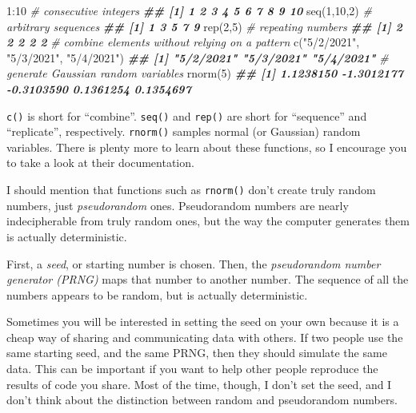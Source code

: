 \documentclass[
  12pt,
  krantz2]{krantz}
\makeatletter
\newenvironment{Shaded}{\begin{snugshade}}{\end{snugshade}}
\newcommand{\CommentTok}[1]{\textcolor[rgb]{0.37,0.37,0.37}{\textit{#1}}}
\newcommand{\DecValTok}[1]{\textcolor[rgb]{0.06,0.06,0.06}{#1}}
\newcommand{\DocumentationTok}[1]{\textcolor[rgb]{0.37,0.37,0.37}{\textbf{\textit{#1}}}}
\newcommand{\FunctionTok}[1]{\textcolor[rgb]{0,0,0}{#1}}
\newcommand{\NormalTok}[1]{#1}
\newcommand{\SpecialCharTok}[1]{\textcolor[rgb]{0,0,0}{#1}}
\newcommand{\StringTok}[1]{\textcolor[rgb]{0.5,0.5,0.5}{#1}}
\newenvironment{kframe}{%
\medskip{}
\setlength{\fboxsep}{.8em}
 \def\at@end@of@kframe{}%
 \ifinner\ifhmode%
  \def\at@end@of@kframe{\end{minipage}}%
  \begin{minipage}{\columnwidth}%
 \fi\fi%
 \def\FrameCommand##1{\hskip\@totalleftmargin \hskip-\fboxsep
 \colorbox{shadecolor}{##1}\hskip-\fboxsep
     \hskip-\linewidth \hskip-\@totalleftmargin \hskip\columnwidth}%
 \MakeFramed {\advance\hsize-\width
   \@totalleftmargin\z@ \linewidth\hsize
   \@setminipage}}%
 {\par\unskip\endMakeFramed%
 \at@end@of@kframe}
\renewenvironment{Shaded}{\begin{kframe}}{\end{kframe}}
\makeatother
\begin{document}
\begin{Shaded}
\begin{Highlighting}[]
\DecValTok{1}\SpecialCharTok{:}\DecValTok{10}         \CommentTok{\# consecutive integers}
\DocumentationTok{\#\#  [1]  1  2  3  4  5  6  7  8  9 10}
\FunctionTok{seq}\NormalTok{(}\DecValTok{1}\NormalTok{,}\DecValTok{10}\NormalTok{,}\DecValTok{2}\NormalTok{)  }\CommentTok{\# arbitrary sequences}
\DocumentationTok{\#\# [1] 1 3 5 7 9}
\FunctionTok{rep}\NormalTok{(}\DecValTok{2}\NormalTok{,}\DecValTok{5}\NormalTok{)     }\CommentTok{\# repeating numbers}
\DocumentationTok{\#\# [1] 2 2 2 2 2}
\CommentTok{\# combine elements without relying on a pattern}
\FunctionTok{c}\NormalTok{(}\StringTok{"5/2/2021"}\NormalTok{, }\StringTok{"5/3/2021"}\NormalTok{, }\StringTok{"5/4/2021"}\NormalTok{) }
\DocumentationTok{\#\# [1] "5/2/2021" "5/3/2021" "5/4/2021"}
\CommentTok{\# generate Gaussian random variables}
\FunctionTok{rnorm}\NormalTok{(}\DecValTok{5}\NormalTok{)                             }
\DocumentationTok{\#\# [1]  1.1238150 {-}1.3012177 {-}0.3103590  0.1361254  0.1354697}
\end{Highlighting}
\end{Shaded}

\texttt{c()} is short for ``combine''. \texttt{seq()} and \texttt{rep()} are short for ``sequence'' and ``replicate'', respectively. \texttt{rnorm()} samples normal (or Gaussian) random variables. There is plenty more to learn about these functions, so I encourage you to take a look at their documentation.

I should mention that functions such as \texttt{rnorm()} don't create truly random numbers, just \emph{pseudorandom} ones. Pseudorandom numbers are nearly indecipherable from truly random ones, but the way the computer generates them is actually deterministic.

First, a \emph{seed}, or starting number is chosen. Then, the \emph{pseudorandom number generator (PRNG)} maps that number to another number. The sequence of all the numbers appears to be random, but is actually deterministic.

Sometimes you will be interested in setting the seed on your own because it is a cheap way of sharing and communicating data with others. If two people use the same starting seed, and the same PRNG, then they should simulate the same data. This can be important if you want to help other people reproduce the results of code you share. Most of the time, though, I don't set the seed, and I don't think about the distinction between random and pseudorandom numbers.
\end{document}
